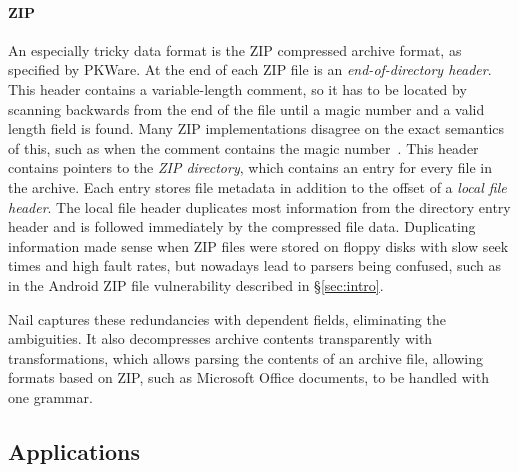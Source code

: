 \paragraph{ZIP} An especially tricky data format is the ZIP compressed archive format, as specified
by PKWare. At the end of each ZIP file is an
\emph{end-of-directory header}. This header contains a variable-length comment, so it has to be
located by scanning backwards from the end of the file until a magic number and a valid length field
is found. Many ZIP implementations disagree on the exact semantics of this, such as when the comment
contains the magic number~\cite{wolf:berlinsides-zip}.
This header  contains pointers to the \emph{ZIP directory}, which contains an entry for every file
in the archive.  Each entry stores file metadata in addition to the
offset of a \emph{local file header}. The local file header duplicates
most information from the directory entry header and is followed immediately by the compressed
file data.
Duplicating information made sense when ZIP files were stored on floppy
disks with slow seek times and high fault rates, but nowadays lead to parsers being confused, such
as in the Android ZIP file vulnerability described in \S\ref{sec:intro}.



Nail captures these redundancies with dependent fields, eliminating the ambiguities. It also  decompresses
archive contents transparently with transformations, which allows parsing the
contents of an archive file, allowing formats based on ZIP, such as Microsoft Office documents, to
be handled with one grammar.



\subsection{Applications}
\label{s:eval-effort}

